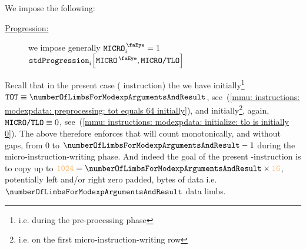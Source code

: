 \begin{center} 
\end{center}
We impose the following:
\begin{description}
	\item[\underline{Progression:}] \label{mmu: instructions: modexpdata: micro instruction writing: tlo progression}
		we impose generally \If $\isMicro_{i} = 1$ \Then $\stdProgression_{i}\Big[\isMicro, \microTlo \Big]$
\end{description}
\saNote{} \label{mmu: modexData: microTLO explanation}
Recall that in the present case (\mmuInstFlagModexpData{} instruction) the we have
initially\footnote{i.e. during the pre-processing phase} $\ppTot \equiv \numberOfLimbsForModexpArgumentsAndResult$,
see~(\ref{mmu: instructions: modexpdata: preprocessing: tot equals 64 initially}),
and initially\footnote{i.e. on the first micro-instruction-writing row}, again, $\texttt{MICRO}\texttt{/}{\texttt{\texttt{TLO}}} \equiv 0$,
see~(\ref{mmu: instructions: modexpdata: initialize: tlo is initially 0}).
The above therefore enforces that \microTlo{} will count monotonically,
and without gaps, from $0$ to $\numberOfLimbsForModexpArgumentsAndResult - 1$
during the micro-instruction-writing phase.
And indeed the goal of the present \mmuMod{}-instruction is to copy up to
$\modexpMaxByteSizeValue = \numberOfLimbsForModexpArgumentsAndResult \times \llarge$,
potentially left and/or right zero padded, bytes of data i.e. $\numberOfLimbsForModexpArgumentsAndResult$ data limbs.
